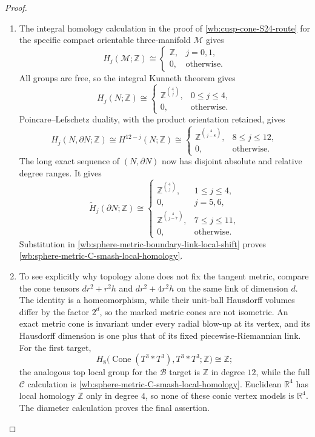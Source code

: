 \begin{proof}
\begin{enumerate}[label=\arabic*.,leftmargin=*]
\item The integral homology calculation in the proof of
\cref{wb:cusp-cone-S24-route} for the specific compact orientable
three-manifold \(\mathcal M\) gives
\[
 H_j(\mathcal M;\mathbb Z)\cong
 \begin{cases}
  \mathbb Z,&j=0,1,\\
  0,&\text{otherwise}.
 \end{cases}
\]
All groups are free, so the integral Kunneth theorem gives
\[
 H_j(N;\mathbb Z)\cong
 \begin{cases}
  \mathbb Z^{\binom4j},&0\leq j\leq4,\\
  0,&\text{otherwise}.
 \end{cases}
\]
Poincare--Lefschetz duality, with the product orientation retained, gives
\[
 H_j(N,\partial N;\mathbb Z)
 \cong H^{12-j}(N;\mathbb Z)
 \cong
 \begin{cases}
  \mathbb Z^{\binom4{j-8}},&8\leq j\leq12,\\
  0,&\text{otherwise}.
 \end{cases}
\]
The long exact sequence of \((N,\partial N)\) now has disjoint absolute
and relative degree ranges.  It gives
\[
 \widetilde H_j(\partial N;\mathbb Z)\cong
 \begin{cases}
  \mathbb Z^{\binom4j},&1\leq j\leq4,\\
  0,&j=5,6,\\
  \mathbb Z^{\binom4{j-7}},&7\leq j\leq11,\\
  0,&\text{otherwise}.
 \end{cases}
\]
Substitution in
\eqref{wb:sphere-metric-boundary-link-local-shift} proves
\eqref{wb:sphere-metric-C-smash-local-homology}.

\item To see explicitly why topology alone does not fix the tangent metric, compare the cone tensors $dr^2+r^2h$ and $dr^2+4r^2h$ on the same link of dimension $d$. The identity is a homeomorphism, while their unit-ball Hausdorff volumes differ by the factor $2^d$, so the marked metric cones are not isometric. An exact metric cone is invariant under every radial blow-up at its vertex,
and its Hausdorff dimension is one plus that of its fixed
piecewise-Riemannian link.  For the first target,
\[
 H_8\bigl(\operatorname{Cone}(T^3*T^3),T^3*T^3;\mathbb Z\bigr)
 \cong\mathbb Z;
\]
the analogous top local group for the \(\mathcal B\) target is
\(\mathbb Z\) in degree \(12\), while the full \(\mathcal C\) calculation
is \eqref{wb:sphere-metric-C-smash-local-homology}.  Euclidean
\(\mathbb R^4\) has local homology \(\mathbb Z\) only in degree \(4\), so
none of these conic vertex models is \(\mathbb R^4\).  The diameter
calculation proves the final assertion.
\end{enumerate}
\end{proof}

